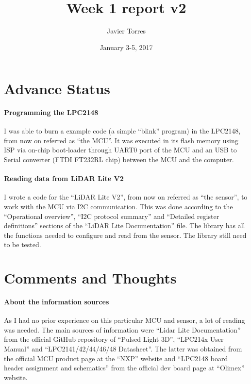 \documentclass{article}
\title{Week 1 report v2}
\author{Javier Torres}
\date{January 3-5, 2017}
\begin{document}
\maketitle
\tableofcontents
\section{Advance Status}
\paragraph{Programming the LPC2148}
I was able to burn a example code (a simple “blink” program) in the LPC2148, from now on referred as “the MCU”. It was executed in its flash memory using ISP via on-chip boot-loader through UART0 port of the MCU and an USB to Serial converter (FTDI FT232RL chip) between the MCU and the computer.
\paragraph{Reading data from LiDAR Lite V2}
I wrote a code for the “LiDAR Lite V2”, from now on referred as “the sensor”, to work with the MCU via I2C communication.
This was done according to the “Operational overview”, “I2C protocol summary” and “Detailed register definitions” sections of the “LiDAR Lite Documentation” file. 
The library has all the functions needed to configure and read from the sensor. 
The library still need to be tested.

\section{Comments and Thoughts}
\paragraph{About the information sources}
As I had no prior experience on this particular MCU and sensor, a lot of reading was needed. 
The main sources of information were “Lidar Lite Documentation” from the official GitHub repository of “Pulsed Light 3D”, “LPC214x User Manual” and “LPC2141/42/44/46/48 Datasheet”. 
The latter was obtained from the official MCU product page at the “NXP” website and “LPC2148 board header assignment and schematics” from the official dev board page at “Olimex” website.
\end{document}
